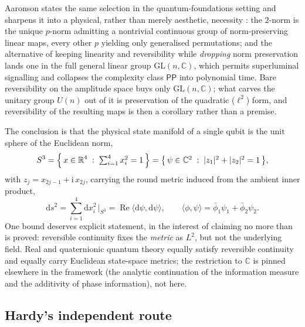 \documentclass{article}
\begin{document}
Aaronson states the same selection in the quantum-foundations setting and
sharpens it into a physical, rather than merely aesthetic, necessity
\autocite{Aaronson2004h}: the $2$-norm is the unique $p$-norm admitting a
nontrivial continuous group of norm-preserving linear maps, every other $p$
yielding only generalised permutations; and the alternative of keeping linearity
and reversibility while \emph{dropping} norm preservation lands one in the full
general linear group $\mathrm{GL}(n,\mathbb{C})$, which permits superluminal
signalling and collapses the complexity class $\mathsf{PP}$ into polynomial time.
Bare reversibility on the amplitude space buys only $\mathrm{GL}(n,\mathbb{C})$;
what carves the unitary group $U(n)$ out of it is preservation of the quadratic
($\ell^{2}$) form, and reversibility of the resulting maps is then a corollary
rather than a premise.

The conclusion is that the physical state manifold of a single qubit is the unit
sphere of the Euclidean norm,
\begin{equation}
  S^{3}=\Bigl\{\,x\in\mathbb{R}^{4}\;:\;\textstyle\sum_{i=1}^{4}x_{i}^{2}=1\,\Bigr\}
  =\bigl\{\,\psi\in\mathbb{C}^{2}\;:\;\lvert z_{1}\rvert^{2}+\lvert z_{2}\rvert^{2}=1\,\bigr\},
\end{equation}
with $z_{j}=x_{2j-1}+\mathrm{i}\,x_{2j}$, carrying the round metric induced from
the ambient inner product,
\begin{equation}
  \mathrm{d}s^{2}=\sum_{i=1}^{4}\mathrm{d}x_{i}^{2}\,\Big|_{S^{3}}
  =\operatorname{Re}\langle\mathrm{d}\psi,\mathrm{d}\psi\rangle,
  \qquad
  \langle\phi,\psi\rangle=\bar\phi_{1}\psi_{1}+\bar\phi_{2}\psi_{2}.
\end{equation}
One bound deserves explicit statement, in the interest of claiming no more than
is proved: reversible continuity fixes the \emph{metric} as $L^{2}$, but not the
underlying field. Real and quaternionic quantum theory equally satisfy reversible
continuity and equally carry Euclidean state-space metrics; the restriction to
$\mathbb{C}$ is pinned elsewhere in the framework (the analytic continuation of
the information measure and the additivity of phase information), not here.

\subsection{Hardy's independent route}
\label{sec:hardy-route}
\end{document}
